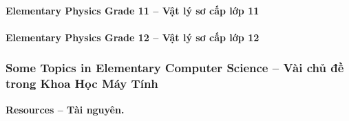 \documentclass[12pt]{article}
\begin{document}
\paragraph{Elementary Physics Grade 11 -- Vật lý sơ cấp lớp 11}

\paragraph{Elementary Physics Grade 12 -- Vật lý sơ cấp lớp 12}


\subsubsection{Some Topics in Elementary Computer Science -- Vài chủ đề trong Khoa Học Máy Tính}
\textbf{\textsf{Resources -- Tài nguyên.}}
\end{document}
